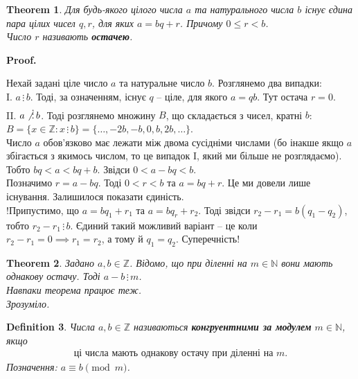 \documentclass[a4paper, 10pt]{article}
\makeatletter
\def\qed{$\blacksquare$}
\theoremstyle{theoremdd}
\newtheorem{theorem}{Theorem}[subsection]
\theoremstyle{theoremdd}
\newtheorem{definition}[theorem]{Definition}
\theoremstyle{theoremdd}
\theoremstyle{theoremdd}
\theoremstyle{theoremdd}
\theoremstyle{theoremdd}
\theoremstyle{theoremdd}
\theoremstyle{theoremdd}
\renewenvironment{proof}[1][Proof.\\]{\par
\pushQED{\hfill \qed}%
\normalfont \topsep6\p@\@plus6\p@\relax
\trivlist
\item\relax
{\bfseries
#1\@addpunct{.}}\hspace\labelsep\ignorespaces
}{%
\popQED\endtrivlist\@endpefalse
}
\newcommand\divisibleBy{\, \vdots \,}
\makeatother
\begin{document}
\begin{theorem}
Для будь-якого цілого числа $a$ та натурального числа $b$ існує єдина пара цілих чисел $q,r$, для яких $a = bq + r$. Причому $0 \leq r < b$.\\
Число $r$ називають \textbf{остачею}.
\end{theorem}

\begin{proof}
Нехай задані ціле число $a$ та натуральне число $b$. Розглянемо два випадки:\\
I. $a \divisibleBy b$. Тоді, за означенням, існує $q$ -- ціле, для якого $a = qb$. Тут остача $r = 0$.\\
II. $a \not\divisibleBy b$. Тоді розглянемо множину $B$, що складається з чисел, кратні $b$:\\
$B = \{x \in \mathbb{Z}: x \divisibleBy b \} = \{\dots,-2b,-b,0,b,2b,\dots\}$.\\
Число $a$ обов'язково має лежати між двома сусідніми числами (бо інакше якщо $a$ збігається з якимось числом, то це випадок I, який ми більше не розглядаємо). Тобто $bq < a < bq+b$. Звідси $0 < a-bq < b$.\\
Позначимо $r = a-bq$. Тоді $0 < r < b$ та $a = bq+r$. Це ми довели лише існування. Залишилося показати єдиність.\\
!Припустимо, що $a = bq_1+r_1$ та $a = bq_r+r_2$. Тоді звідси $r_2-r_1 = b(q_1-q_2)$, тобто $r_2-r_1 \divisibleBy b$. Єдиний такий можливий варіант -- це коли $r_2-r_1 = 0 \implies r_1 = r_2$, а тому й $q_1 = q_2$. Суперечність!
\end{proof}

\begin{theorem}
Задано $a,b \in \mathbb{Z}$. Відомо, що при діленні на $m \in \mathbb{N}$ вони мають однакову остачу. Тоді $a-b \divisibleBy m$.\\
Навпаки теорема працює теж.\\
\textit{Зрозуміло.}
\end{theorem}

\begin{definition}
Числа $a,b \in \mathbb{Z}$ називаються \textbf{конгруентними за модулем} $m \in \mathbb{N}$, якщо
\begin{align*}
\text{ці числа мають однакову остачу при діленні на $m$.}
\end{align*}
Позначення: $a \equiv b \pmod m$.
\end{definition}
\end{document}
